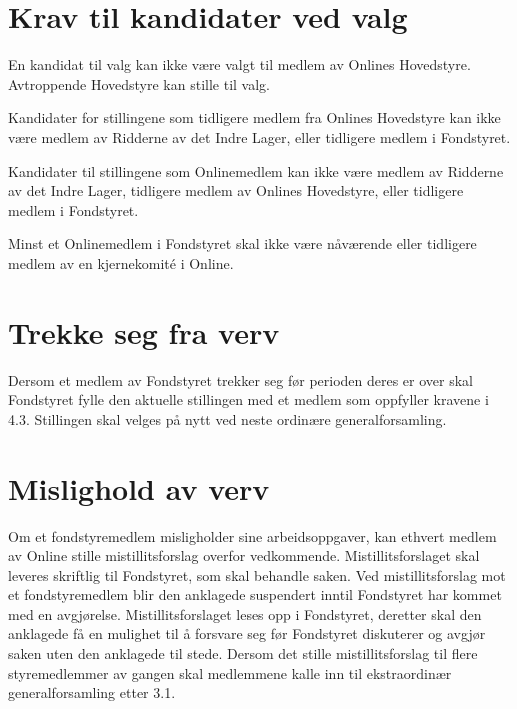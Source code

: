 \section{Krav til kandidater ved valg}
En kandidat til valg kan ikke være valgt til medlem av Onlines Hovedstyre. Avtroppende Hovedstyre kan stille til valg.

Kandidater for stillingene som tidligere medlem fra Onlines Hovedstyre kan ikke være medlem av Ridderne av det Indre Lager, eller tidligere medlem i Fondstyret.

Kandidater til stillingene som Onlinemedlem kan ikke være medlem av Ridderne av det Indre Lager, tidligere medlem av Onlines Hovedstyre, eller tidligere medlem i Fondstyret.

Minst et Onlinemedlem i Fondstyret skal ikke være nåværende eller tidligere medlem av en kjernekomité i Online.

\section{Trekke seg fra verv}

Dersom et medlem av Fondstyret trekker seg før perioden deres er over skal Fondstyret fylle den aktuelle stillingen med et medlem som oppfyller kravene i 4.3. Stillingen skal velges på nytt ved neste ordinære generalforsamling.

\section{Mislighold av verv}
Om et fondstyremedlem misligholder sine arbeidsoppgaver, kan ethvert medlem av Online stille mistillitsforslag overfor vedkommende. Mistillitsforslaget skal leveres skriftlig til Fondstyret, som skal behandle saken. Ved mistillitsforslag mot et fondstyremedlem blir den anklagede suspendert inntil Fondstyret har kommet med en avgjørelse. Mistillitsforslaget leses opp i Fondstyret, deretter skal den anklagede få en mulighet til å forsvare seg før Fondstyret diskuterer og avgjør saken uten den anklagede til stede. Dersom det stille mistillitsforslag til flere styremedlemmer av gangen skal medlemmene kalle inn til ekstraordinær generalforsamling etter 3.1.
